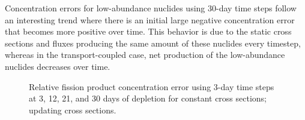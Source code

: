     Concentration errors for low-abundance nuclides using 30-day time steps follow
    an interesting trend where there is an initial large negative concentration
    error that becomes more positive over time. This behavior is due to
    the static cross sections and fluxes producing the same amount of these
    nuclides every timestep, whereas in the transport-coupled case,
    net production of the low-abundance nuclides decreases over time.

    \begin{figure}[h!tpb]
        \centering
        \caption[]{Relative fission product concentration error using 3-day time
            steps at 3, 12, 21, and 30 days of depletion for
             constant cross sections;
             updating cross sections.}
    \end{figure}

